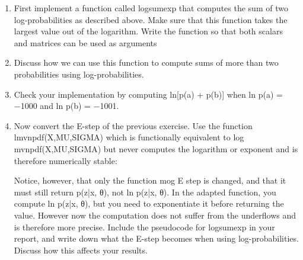 \documentclass[a4paper,11pt]{article}
\begin{document}
\begin{enumerate}
\item
First implement a function called logsumexp that computes the sum of two log-probabilities as described above. Make sure that this function takes the largest value out of the logarithm. Write the function so that both scalars and matrices can be used as arguments

\item 
Discuss how we can use this function to compute sums of more than two probabilities using log-probabilities.

\item
Check your implementation by computing ln[p(a) + p(b)] when ln p(a) = −1000 and ln p(b) = −1001.

\item
Now convert the E-step of the previous exercise. Use the function lmvnpdf(X,MU,SIGMA) which is functionally equivalent to log mvnpdf(X,MU,SIGMA) but never computes the logarithm or exponent and is therefore numerically stable:

Notice, however, that only the function mog E step is changed, and that it must still return p(z|x, θ),
not ln p(z|x, θ). In the adapted function, you compute ln p(z|x, θ), but you need to exponentiate it before
returning the value. However now the computation does not suffer from the underflows and is therefore more
precise.
Include the pseudocode for logsumexp in your report, and write down what the E-step becomes when
using log-probabilities. Discuss how this affects your results.
\end{enumerate}




\end{document}
